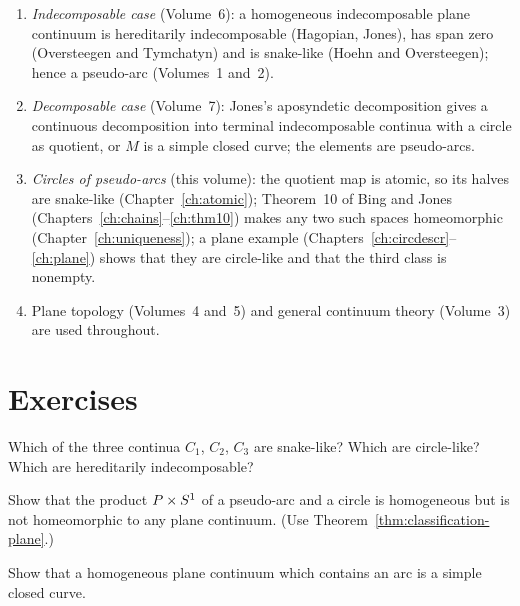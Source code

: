 \begin{enumerate}
\item \emph{Indecomposable case} (Volume~6): a homogeneous indecomposable plane continuum is hereditarily indecomposable (Hagopian, Jones), has span zero (Oversteegen and Tymchatyn) and is
snake-like (Hoehn and Oversteegen); hence a pseudo-arc (Volumes~1 and~2).
\item \emph{Decomposable case} (Volume~7): Jones's aposyndetic decomposition gives a continuous decomposition into terminal indecomposable continua with a circle as quotient, or $M$ is a simple
closed curve; the elements are pseudo-arcs.
\item \emph{Circles of pseudo-arcs} (this volume): the quotient map is atomic, so its halves are snake-like (Chapter~\ref{ch:atomic}); Theorem~10 of Bing and Jones (Chapters~\ref{ch:chains}--\ref{ch:thm10})
makes any two such spaces homeomorphic (Chapter~\ref{ch:uniqueness}); a plane example (Chapters~\ref{ch:circdescr}--\ref{ch:plane}) shows that they are circle-like and that the third class is
nonempty.
\item Plane topology (Volumes~4 and~5) and general continuum theory (Volume~3) are used throughout.
\end{enumerate}

\section*{Exercises}

\begin{exercise}
Which of the three continua $C_1$, $C_2$, $C_3$ are snake-like? Which are circle-like? Which are hereditarily indecomposable?
\end{exercise}

\begin{exercise}
Show that the product $P\times S^1$ of a pseudo-arc and a circle is homogeneous but is not homeomorphic to any plane continuum. (Use Theorem~\ref{thm:classification-plane}.)
\end{exercise}

\begin{exercise}
Show that a homogeneous plane continuum which contains an arc is a simple closed curve.
\end{exercise}
